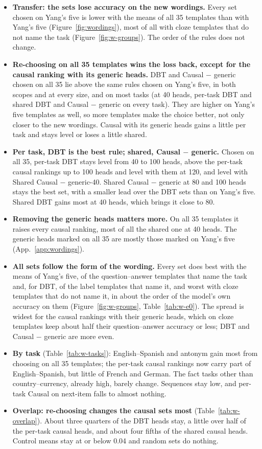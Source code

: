 \documentclass[10pt,a4paper]{article}
\begin{document}
\begin{itemize}
\item \textbf{Transfer: the sets lose accuracy on the new wordings.} Every set chosen on Yang's five is lower with the means of all 35 templates than with Yang's five (Figure~\ref{fig:wordings}), most of all with cloze templates that do not name the task (Figure~\ref{fig:w-groups}). The order of the rules does not change.
\item \textbf{Re-choosing on all 35 templates wins the loss back, except for the causal ranking with its generic heads.} DBT and Causal $-$ generic chosen on all 35 lie above the same rules chosen on Yang's five, in both scopes and at every size, and on most tasks (at 40 heads, per-task DBT and shared DBT and Causal $-$ generic on every task). They are higher on Yang's five templates as well, so more templates make the choice better, not only closer to the new wordings. Causal with its generic heads gains a little per task and stays level or loses a little shared.
\item \textbf{Per task, DBT is the best rule; shared, Causal $-$ generic.} Chosen on all 35, per-task DBT stays level from 40 to 100 heads, above the per-task causal rankings up to 100 heads and level with them at 120, and level with Shared Causal $-$ generic-40. Shared Causal $-$ generic at 80 and 100 heads stays the best set, with a smaller lead over the DBT sets than on Yang's five. Shared DBT gains most at 40 heads, which brings it close to 80.
\item \textbf{Removing the generic heads matters more.} On all 35 templates it raises every causal ranking, most of all the shared one at 40 heads. The generic heads marked on all 35 are mostly those marked on Yang's five (App.~\ref{app:wordings}).
\item \textbf{All sets follow the form of the wording.} Every set does best with the means of Yang's five, of the question--answer templates that name the task and, for DBT, of the label templates that name it, and worst with cloze templates that do not name it, in about the order of the model's own accuracy on them (Figure~\ref{fig:w-groups}, Table~\ref{tab:w-e0}). The spread is widest for the causal rankings with their generic heads, which on cloze templates keep about half their question--answer accuracy or less; DBT and Causal $-$ generic are more even.
\item \textbf{By task} (Table~\ref{tab:w-tasks}): English--Spanish and antonym gain most from choosing on all 35 templates; the per-task causal rankings now carry part of English--Spanish, but little of French and German. The fact tasks other than country--currency, already high, barely change. Sequences stay low, and per-task Causal on next-item falls to almost nothing.
\item \textbf{Overlap: re-choosing changes the causal sets most} (Table~\ref{tab:w-overlap}). About three quarters of the DBT heads stay, a little over half of the per-task causal heads, and about four fifths of the shared causal heads. Control means stay at or below 0.04 and random sets do nothing.
\end{itemize}
\end{document}
